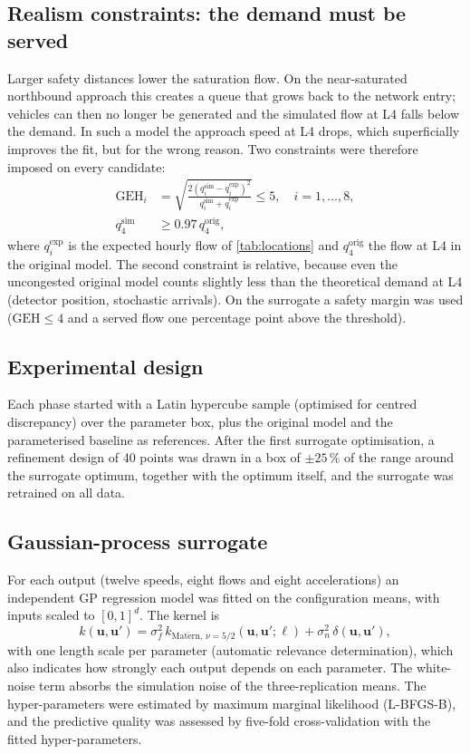 \documentclass[11pt,a4paper]{article}
\newcommand{\GEH}{\mathrm{GEH}}
\begin{document}
\subsection{Realism constraints: the demand must be served}
\label{sec:constraints}

Larger safety distances lower the saturation flow. On the near-saturated northbound approach this
creates a queue that grows back to the network entry; vehicles can then no longer be generated and
the simulated flow at L4 falls below the demand. In such a model the approach speed at L4 drops,
which superficially improves the fit, but for the wrong reason. Two constraints were therefore
imposed on every candidate:
\begin{align}
\GEH_i &= \sqrt{\frac{2 (q_i^{\mathrm{sim}}-q_i^{\mathrm{exp}})^2}{q_i^{\mathrm{sim}}+q_i^{\mathrm{exp}}}} \le 5, \quad i = 1,\dots,8,\\
q_4^{\mathrm{sim}} &\ge 0.97\, q_4^{\mathrm{orig}},
\end{align}
where $q_i^{\mathrm{exp}}$ is the expected hourly flow of \cref{tab:locations} and
$q_4^{\mathrm{orig}}$ the flow at L4 in the original model. The second constraint is relative,
because even the uncongested original model counts slightly less than the theoretical demand at L4
(detector position, stochastic arrivals). On the surrogate a safety margin was used
($\GEH \le 4$ and a served flow one percentage point above the threshold).

\subsection{Experimental design}

Each phase started with a Latin hypercube sample (optimised for centred discrepancy) over the
parameter box, plus the original model and the parameterised baseline as references. After the
first surrogate optimisation, a refinement design of 40 points was drawn in a box of $\pm 25\,\%$
of the range around the surrogate optimum, together with the optimum itself, and the surrogate was
retrained on all data.

\subsection{Gaussian-process surrogate}

For each output (twelve speeds, eight flows and eight accelerations) an independent GP regression
model was fitted on the configuration means, with inputs scaled to $[0,1]^d$. The kernel is
\begin{equation}
k(\mathbf u,\mathbf u') = \sigma_f^2\, k_{\mathrm{Mat\acute ern},\,\nu=5/2}\!\left(\mathbf u,\mathbf u'; \boldsymbol\ell\right) + \sigma_n^2\,\delta(\mathbf u,\mathbf u'),
\end{equation}
with one length scale per parameter (automatic relevance determination), which also indicates how
strongly each output depends on each parameter. The white-noise term absorbs the simulation noise
of the three-replication means. The hyper-parameters were estimated by maximum marginal likelihood
(L-BFGS-B), and the predictive quality was assessed by five-fold cross-validation with the fitted
hyper-parameters.
\end{document}
